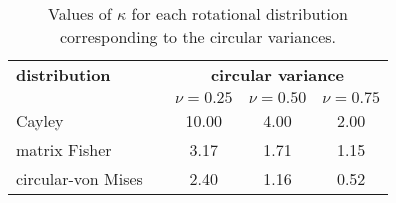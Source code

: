\begin{table}[h!]
\caption{Values of $\kappa$ for each rotational distribution corresponding to the circular variances.  \label{tab:kappas}}
\begin{center}
\begin{tabular}{l l ccc}\hline
\bf distribution & & \multicolumn{3}{c}{\bf circular variance} \\
& & $\nu=0.25$ &$\nu=0.50$ & $\nu=0.75$\\ \hline \hline
Cayley & & 10.00 & 4.00 & 2.00 \\
matrix Fisher & & 3.17 & 1.71 & 1.15\\
circular-von Mises & & 2.40 & 1.16 & 0.52\\\hline
\end{tabular}
\end{center}
\end{table}



